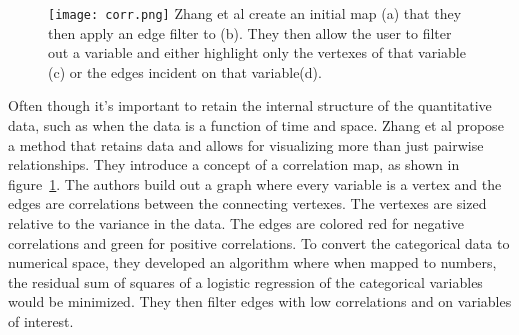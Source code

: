 \documentclass[../main.text]{subfiles}
\begin{document}
\begin{figure}
  \texttt{[image: corr.png]}
  \label{caption} Zhang et al create an initial map (a) that they then apply an
  edge filter to (b). They then allow the user to filter out a variable and
  either highlight only the vertexes of that variable (c) or the edges incident
  on that variable(d).
  \label{fig:corr}
\end{figure}

Often though it's important to retain the internal structure of the
quantitative data, such as when the data is a function of time and
space. Zhang et al propose a method that retains data and allows for
visualizing more than just pairwise relationships\cite{zhang_visual_2015}. They
introduce a concept of a correlation map, as shown in
figure~\ref{fig:corr}. The authors build out a graph where every variable is a
vertex and the edges are correlations between the connecting vertexes. The
vertexes are sized relative to the variance in the data. The edges are colored
red for negative correlations and green for positive correlations. To convert
the categorical data to numerical space, they developed an algorithm where when
mapped to numbers, the residual sum of squares of a logistic regression of the
categorical variables  would be minimized. They then filter edges with low
correlations and on variables of interest.
\end{document}
